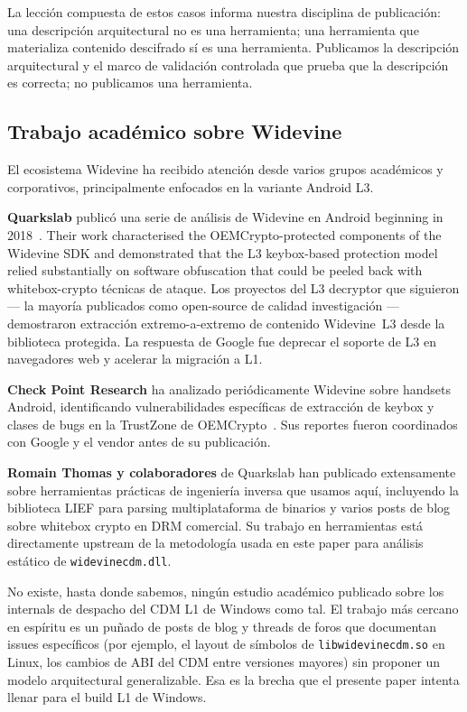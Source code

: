 \documentclass[11pt,letterpaper]{article}
\begin{document}
La lección compuesta de estos casos informa nuestra disciplina de
publicación: una descripción arquitectural no es una herramienta;
una herramienta que materializa contenido descifrado sí es una
herramienta. Publicamos la descripción arquitectural y el marco
de validación controlada que prueba que la descripción es
correcta; no publicamos una herramienta.

\subsection{Trabajo académico sobre Widevine}
\label{sec:ante-widevine}

El ecosistema Widevine ha recibido atención desde varios grupos
académicos y corporativos, principalmente enfocados en la
variante Android L3.

\textbf{Quarkslab} publicó una serie de análisis de Widevine en
Android beginning in 2018~\cite{quarkslab-widevine,
quarkslab-android-widevine}. Their work characterised the
OEMCrypto-protected components of the Widevine SDK and demonstrated
that the L3 keybox-based protection model relied substantially on
software obfuscation that could be peeled back with whitebox-crypto
técnicas de ataque. Los proyectos del L3 decryptor que siguieron
\cite{l3-decryptor, ango-l3-decryptor} --- la mayoría publicados
como open-source de calidad investigación --- demostraron
extracción extremo-a-extremo de contenido Widevine~L3 desde la
biblioteca protegida. La respuesta de Google fue deprecar el
soporte de L3 en navegadores web y acelerar la migración a L1.

\textbf{Check Point Research} ha analizado periódicamente Widevine
sobre handsets Android, identificando vulnerabilidades específicas
de extracción de keybox y clases de bugs en la TrustZone de
OEMCrypto~\cite{checkpoint-widevine}. Sus reportes fueron
coordinados con Google y el vendor antes de su publicación.

\textbf{Romain Thomas y colaboradores} de Quarkslab han publicado
extensamente sobre herramientas prácticas de ingeniería inversa
que usamos aquí, incluyendo la biblioteca LIEF para parsing
multiplataforma de binarios \cite{lief-tool} y varios posts de
blog sobre whitebox crypto en DRM comercial. Su trabajo en
herramientas está directamente upstream de la metodología usada
en este paper para análisis estático de \texttt{widevinecdm.dll}.

No existe, hasta donde sabemos, ningún estudio académico publicado
sobre los internals de despacho del CDM L1 de Windows como tal. El
trabajo más cercano en espíritu es un puñado de posts de blog y
threads de foros que documentan issues específicos (por ejemplo,
el layout de símbolos de \texttt{libwidevinecdm.so} en Linux, los
cambios de ABI del CDM entre versiones mayores) sin proponer un
modelo arquitectural generalizable. Esa es la brecha que el
presente paper intenta llenar para el build L1 de Windows.
\end{document}
